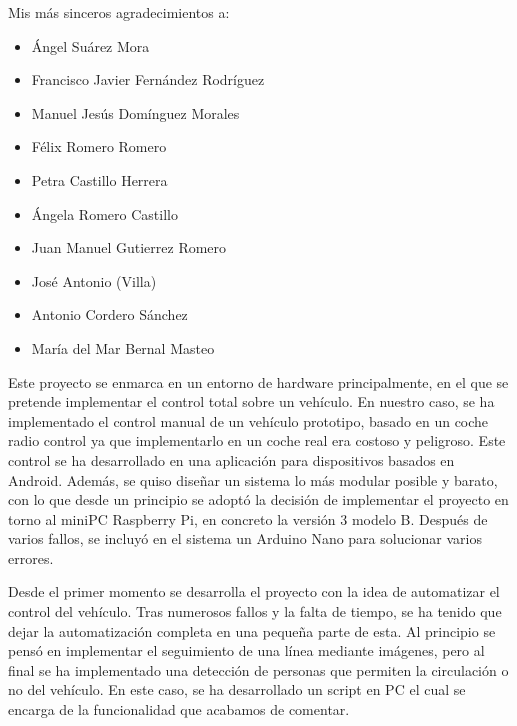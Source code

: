 \documentclass{pclass}
\begin{document}
\setlength{\parskip}{4ex}

\hacerportada

	
\frontmatter


Mis más sinceros agradecimientos a:

\begin{itemize}
	\item Ángel Suárez Mora
	\item Francisco Javier Fernández Rodríguez
	\item Manuel Jesús Domínguez Morales
	\item Félix Romero Romero
	\item Petra Castillo Herrera
	\item Ángela Romero Castillo
	\item Juan Manuel Gutierrez Romero
	\item José Antonio (Villa)
	\item Antonio Cordero Sánchez
	\item María del Mar Bernal Masteo
	
\end{itemize}
 

Este proyecto se enmarca en un entorno de hardware principalmente, en el que se pretende implementar el control total sobre un vehículo. En nuestro caso, se ha implementado el control manual de un vehículo prototipo, basado en un coche radio control ya que implementarlo en un coche real era costoso y peligroso. Este control se ha desarrollado en una aplicación para dispositivos basados en Android. Además, se quiso diseñar un sistema lo más modular posible y barato, con lo que desde un principio se adoptó la decisión de implementar el proyecto en torno al miniPC Raspberry Pi, en concreto la versión 3 modelo B. Después de varios fallos, se incluyó en el sistema un Arduino Nano para solucionar varios errores.



Desde el primer momento se desarrolla el proyecto con la idea de automatizar el control del vehículo. Tras numerosos fallos y la falta de tiempo, se ha tenido que dejar la automatización completa en una pequeña parte de esta. Al principio se pensó en implementar el seguimiento de una línea mediante imágenes, pero al final se ha implementado una detección de personas que permiten la circulación o no del vehículo. En este caso, se ha desarrollado un script en PC el cual se encarga de la funcionalidad que acabamos de comentar.
\end{document}
